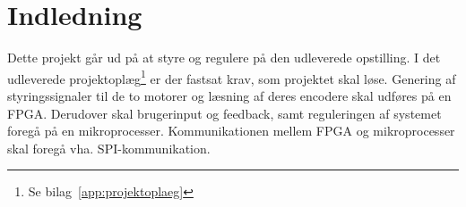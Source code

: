 \documentclass[rapport.tex]{subfiles}
\begin{document}
\chapter{Indledning}

Dette projekt går ud på at styre og regulere på den udleverede opstilling. I det udleverede projektoplæg\footnote{Se bilag~\ref{app:projektoplaeg}} er der fastsat krav, som projektet skal løse. Genering af styringssignaler til  de to motorer og læsning af deres encodere skal udføres på en FPGA. Derudover skal brugerinput og feedback, samt reguleringen af systemet foregå på en mikroprocesser. Kommunikationen mellem FPGA og mikroprocesser skal foregå vha. SPI-kommunikation.
\end{document}

